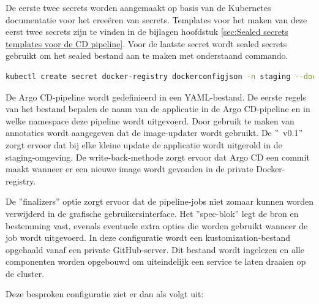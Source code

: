 De eerste twee secrets worden aangemaakt op basis van de Kubernetes documentatie voor het creeëren van secrets. Templates voor het maken van deze eerst twee secrets zijn te vinden in de bijlagen hoofdstuk \ref {sec:Sealed secrets templates voor de CD pipeline}. Voor de laatste secret wordt sealed secrets gebruikt om het sealed bestand aan te maken met onderstaand commando.
\newline

\begin{lstlisting}[language=bash, style=bashstyle]
  kubectl create secret docker-registry dockerconfigjson -n staging --docker-server="https://index.docker.io/v1/" --docker-username=[username]--docker-password=[docker token] --docker-email=[e-mail] --output json --dry-run | kubeseal --scope cluster-wide --cert [certificate location] --format yaml > mysealedsecret.yml
\end{lstlisting}

\vspace{0.5cm}

De Argo CD-pipeline wordt gedefinieerd in een YAML-bestand. De eerste regels van het bestand bepalen de naam van de applicatie in de Argo CD-pipeline en in welke namespace deze pipeline wordt uitgevoerd. Door gebruik te maken van annotaties wordt aangegeven dat de image-updater wordt gebruikt. De ''~v0.1'' zorgt ervoor dat bij elke kleine update de applicatie wordt uitgerold in de staging-omgeving. De write-back-methode zorgt ervoor dat Argo CD een commit maakt wanneer er een nieuwe image wordt gevonden in de private Docker-registry.
\newline

De ''finalizers'' optie zorgt ervoor dat de pipeline-jobs niet zomaar kunnen worden verwijderd in de grafische gebruikersinterface. Het ''spec-blok'' legt de bron en bestemming vast, evenals eventuele extra opties die worden gebruikt wanneer de job wordt uitgevoerd. In deze configuratie wordt een kustomization-bestand opgehaald vanaf een private GitHub-server. Dit bestand wordt ingelezen en alle componenten worden opgebouwd om uiteindelijk een service te laten draaien op de cluster.
\newline

Deze besproken configuratie ziet er dan als volgt uit:
\newline

